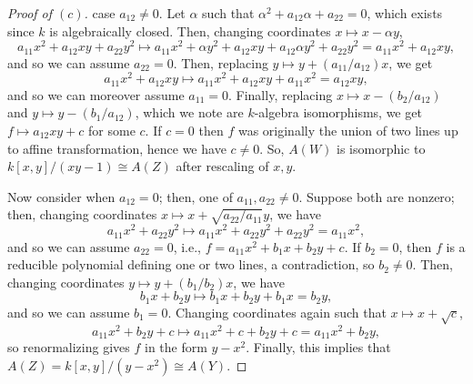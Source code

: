 \documentclass[10pt]{article}
\theoremstyle{definition}
\theoremstyle{remark}
\numberwithin{equation}{section}
\numberwithin{figure}{subsubsection}
\begin{document}
\begin{proof}[Proof of $(c)$]
  case $a_{12} \ne 0$. Let $\alpha$ such that
  $\alpha^2 + a_{12}\alpha + a_{22} = 0$, which exists since $k$ is
  algebraically closed.
  Then, changing coordinates $x \mapsto x - \alpha y$,
  \begin{equation*}
    a_{11}x^2 + a_{12}xy + a_{22}y^2 \mapsto a_{11}x^2 + \alpha y^2 + a_{12}xy + a_{12}\alpha y^2 + a_{22}y^2 = a_{11}x^2 + a_{12}xy,
  \end{equation*}
  and so we can assume $a_{22} = 0$.
  Then, replacing $y \mapsto y + (a_{11}/a_{12})x$, we get
  \begin{equation*}
    a_{11}x^2 + a_{12}xy \mapsto a_{11}x^2 + a_{12}xy + a_{11}x^2 = a_{12}xy,
  \end{equation*}
  and so we can moreover assume $a_{11} = 0$.
  Finally, replacing $x \mapsto x - (b_2/a_{12})$ and
  $y \mapsto y - (b_1/a_{12})$, which we note are $k$-algebra isomorphisms,
  we get $f \mapsto a_{12}xy + c$ for some $c$.
  If $c = 0$ then $f$ was originally the union of two lines up to affine
  transformation, hence we have $c \ne 0$.
  So, $A(W)$ is isomorphic to $k[x,y]/(xy - 1) \cong A(Z)$ after rescaling
  of $x,y$.
  \par Now consider when $a_{12} = 0$; then, one of $a_{11},a_{22} \ne 0$.
  Suppose both are nonzero; then, changing coordinates
  $x \mapsto x + \sqrt{a_{22}/a_{11}}y$, we have
  \begin{equation*}
    a_{11}x^2 + a_{22}y^2 \mapsto a_{11}x^2 + a_{22}y^2 + a_{22}y^2 = a_{11}x^2,
  \end{equation*}
  and so we can assume $a_{22} = 0$, i.e., $f = a_{11}x^2 + b_1x + b_2y + c$.
  If $b_2 = 0$, then $f$ is a reducible polynomial defining one or two lines,
  a contradiction, so $b_2 \ne 0$.
  Then, changing coordinates $y \mapsto y + (b_1/b_2)x$, we have
  \begin{equation*}
    b_1x + b_2y \mapsto b_1x + b_2y + b_1x = b_2y,
  \end{equation*}
  and so we can assume $b_1 = 0$.
  Changing coordinates again such that $x \mapsto x + \sqrt{c}$,
  \begin{equation*}
    a_{11}x^2 + b_2y + c \mapsto a_{11}x^2 + c + b_2y + c = a_{11}x^2 + b_2y,
  \end{equation*}
  so renormalizing gives $f$ in the form $y - x^2$.
  Finally, this implies that $A(Z) = k[x,y]/(y-x^2) \cong A(Y)$.
\end{proof}
\end{document}
